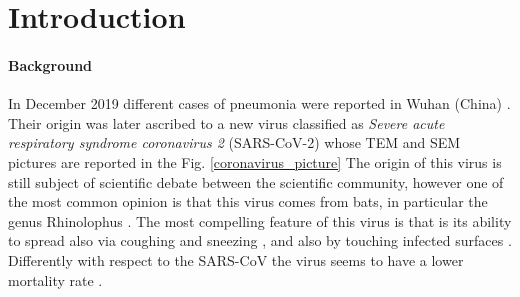 \documentclass[
12pt, %
a4paper, %
oneside, %
headinclude,footinclude, %
BCOR5mm, %
]{scrartcl}
\begin{document}



\newpage %


\section{Introduction} \label{introduction}

\paragraph{Background} \label{Background}
In December 2019 different cases of pneumonia were reported in Wuhan (China) \cite{huang2020clinical}. Their origin was later ascribed to a new virus classified as \textit{Severe acute respiratory syndrome coronavirus 2} (SARS-CoV-2) whose TEM and SEM pictures are reported in the Fig. \ref{coronavirus_picture} The origin of this virus is still subject of scientific debate between the scientific community, however one of the most common opinion is that this virus comes from bats, in particular the genus Rhinolophus \cite{zhou2020pneumonia}. The most compelling feature of this virus is that is its ability to spread also via coughing and sneezing \cite{ghinai2020first}, and also by touching infected surfaces \cite{chang2020protecting}. Differently with respect to the SARS-CoV the virus seems to have a lower mortality rate \cite{sorensen2006severe,weiss2020clinical}.
\end{document}
